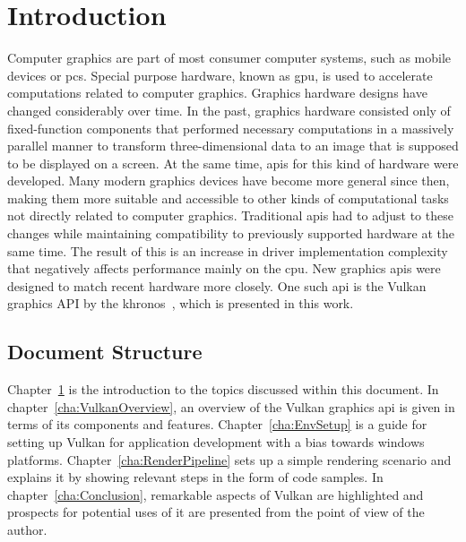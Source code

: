 
\chapter{Introduction}
\label{cha:Introduction}
  Computer graphics are part of most consumer computer systems, such as mobile devices or \glspl{pc}.
  Special purpose hardware, known as \gls{gpu}, is used to accelerate computations related to computer graphics.
  Graphics hardware designs have changed considerably over time.
  In the past, graphics hardware consisted only of fixed-function components that performed necessary computations in a massively parallel manner to transform three-dimensional data to an image that is supposed to be displayed on a screen.
  At the same time, \glspl{api} for this kind of hardware were developed.
  Many modern graphics devices have become more general since then, making them more suitable and accessible to other kinds of computational tasks not directly related to computer graphics.
  Traditional \glspl{api} had to adjust to these changes while maintaining compatibility to previously supported hardware at the same time.
  The result of this is an increase in driver implementation complexity that negatively affects performance mainly on the \gls{cpu}.
  New graphics \glspl{api} were designed to match recent hardware more closely.
  One such \gls{api} is the Vulkan graphics API by the \gls{khronos}~\cite{vkspec}, which is presented in this work.


  \section{Document Structure}
    Chapter~\ref{cha:Introduction} is the introduction to the topics discussed within this document.
    In chapter~\ref{cha:VulkanOverview}, an overview of the Vulkan graphics \gls{api} is given in terms of its components and features.
    Chapter~\ref{cha:EnvSetup} is a guide for setting up Vulkan for application development with a bias towards \gls{windows} platforms.
    Chapter~\ref{cha:RenderPipeline} sets up a simple rendering scenario and explains it by showing relevant steps in the form of code samples.
    In chapter~\ref{cha:Conclusion}, remarkable aspects of Vulkan are highlighted and prospects for potential uses of it are presented from the point of view of the author.

